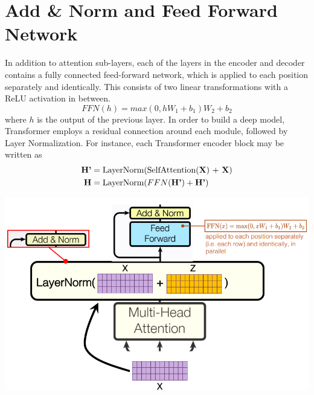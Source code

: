 \section{Add \& Norm and Feed Forward Network}
In addition to attention sub-layers, each of the layers in the encoder and decoder contains a fully connected feed-forward network, which is applied to each position separately and identically. This consists of two linear transformations with a ReLU activation in between.
\[FFN(h) = max(0, hW_1 + b_1)W_2 + b_2\]
where $h$ is the output of the previous layer.\newline\newline
In order to build a deep model, Transformer employs a residual connection around each module, followed by Layer Normalization. For instance, each Transformer encoder block may be written as
\[\begin{split}
    \textbf{H'} & = \text{LayerNorm}(\text{SelfAttention(\textbf{X}) + \textbf{X}})\\
    \textbf{H} & = \text{LayerNorm}(FFN(\textbf{H'}) + \textbf{H'})    
\end{split}
\]
\begin{center}
    \includegraphics[scale=0.6]{images/LayerNorm.png}
\end{center}
